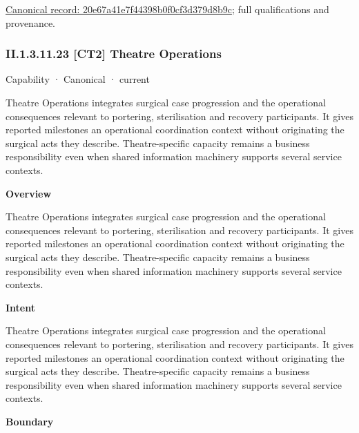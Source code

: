 {\footnotesize \href{../../../../continuum/strategy/capability/20e67a41e7f44398b0f0cf3d379d8b9c.md}{Canonical record: 20e67a41e7f44398b0f0cf3d379d8b9c}; full qualifications and provenance.}\par
\subsubsection*{II.1.3.11.23 [CT2] Theatre Operations}
\label{navigation:II.1.3.11.23}

\label{element:4bf7a8260e1444fdac44e97c3557b533}
{\small Capability · Canonical · current}\par

Theatre Operations integrates surgical case progression and the operational consequences relevant to portering, sterilisation and recovery participants. It gives reported milestones an operational coordination context without originating the surgical acts they describe. Theatre-specific capacity remains a business responsibility even when shared information machinery supports several service contexts.



\textbf{Overview}



Theatre Operations integrates surgical case progression and the operational consequences relevant to portering, sterilisation and recovery participants. It gives reported milestones an operational coordination context without originating the surgical acts they describe. Theatre-specific capacity remains a business responsibility even when shared information machinery supports several service contexts.



\textbf{Intent}



Theatre Operations integrates surgical case progression and the operational consequences relevant to portering, sterilisation and recovery participants. It gives reported milestones an operational coordination context without originating the surgical acts they describe. Theatre-specific capacity remains a business responsibility even when shared information machinery supports several service contexts.



\textbf{Boundary}



